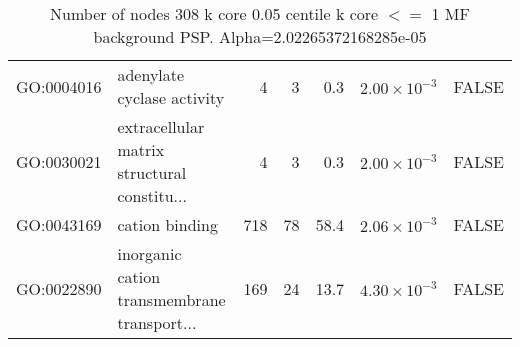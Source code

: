 \begin{table}[ht]
\begin{adjustbox}{width=\textwidth}
\begin{tabular}{llrrrrl}
  GO:0004016 & adenylate cyclase activity & 4 & 3 & 0.3 & $2.00 \times 10^{-3}$ & FALSE \\ 
  GO:0030021 & extracellular matrix structural constitu... & 4 & 3 & 0.3 & $2.00 \times 10^{-3}$ & FALSE \\ 
  GO:0043169 & cation binding & 718 & 78 & 58.4 & $2.06 \times 10^{-3}$ & FALSE \\ 
  GO:0022890 & inorganic cation transmembrane transport... & 169 & 24 & 13.7 & $4.30 \times 10^{-3}$ & FALSE \\ 
   \hline
\end{tabular}
\end{adjustbox}
\caption{Number of nodes 308 k core 0.05 centile  k core $<=$ 1 MF background PSP. Alpha=2.02265372168285e-05} 
\label{tab:Number of nodes 308 k core 0.05 centile  k core $<=$ 1 MF background PSP. Alpha=2.02265372168285e-05}
\end{table}

